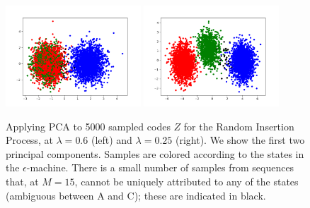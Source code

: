 \documentclass[entropy,article,submit,moreauthors,pdftex,10pt,a4paper]{Definitions/mdpi}
\begin{document}
\begin{figure}
\centering
\includegraphics[width=0.45\textwidth]{code/figures/foo_pca_2.png}
\includegraphics[width=0.45\textwidth]{code/figures/foo_pca_3.png}
	\caption{Applying PCA to 5000 sampled codes $Z$ for the Random Insertion Process, at $\lambda = 0.6$ (left) and $\lambda = 0.25$ (right). We show the first two principal components. Samples are colored according to the states in the $\epsilon$-machine. There is a small number of samples from sequences that, at $M=15$, cannot be uniquely attributed to any of the states (ambiguous between A and C); these are indicated in black.}\label{fig:latent}
\end{figure}
\end{document}
